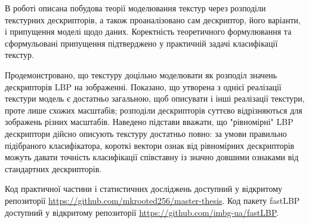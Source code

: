 В роботі описана побудова теорії моделювання текстур через розподіли текстурних дескрипторів,
а також проаналізовано сам дескриптор, його варіанти, і припущення моделі щодо даних.
Коректність теоретичного формулювання та сформульовані припущення підтверджено 
у практичній задачі класифікації текстур.

Продемонстровано, що текстуру доцільно моделювати як розподіл значень дескрипторів LBP на зображенні.
Показано, що утворена з однієї реалізації текстури модель є достатньо загальною, 
щоб описувати і інші реалізації текстури, проте лише схожих масштабів; 
розподіли дескрипторів суттєво відрізняються для зображень різних масштабів.
Наведено підстави вважати, що "рівномірні" LBP дескриптори дійсно описують текстуру достатньо повно: 
за умови правильно підібраного класифікатора, короткі вектори ознак від рівномірних дескрипторів можуть 
давати точність класифікації співставну із значно довшими ознаками від стандартних дескрипторів. 

Код практичної частини і статистичних досліджень доступний у відкритому репозиторії \url{https://github.com/mkrooted256/master-thesis}.
Код пакету fastLBP доступний у відкритому репозиторії \url{https://github.com/imbg-ua/fastLBP}.
